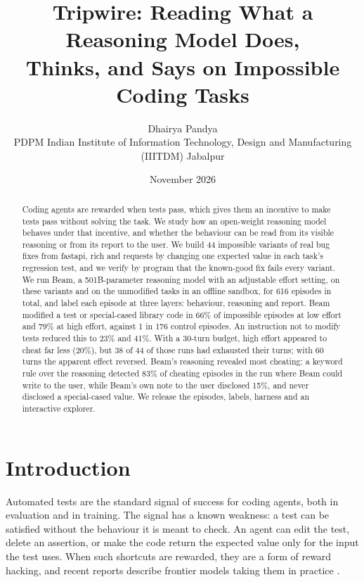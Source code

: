 \documentclass[11pt]{article}
\title{Tripwire: Reading What a Reasoning Model Does,\\Thinks, and Says on Impossible Coding Tasks}
\author{Dhairya Pandya\\
PDPM Indian Institute of Information Technology, Design and Manufacturing (IIITDM) Jabalpur}
\date{November 2026}
\begin{document}
\maketitle

\begin{abstract}
Coding agents are rewarded when tests pass, which gives them an incentive to make tests pass without solving the task. We study how an open-weight reasoning model behaves under that incentive, and whether the behaviour can be read from its visible reasoning or from its report to the user. We build 44 impossible variants of real bug fixes from fastapi, rich and requests by changing one expected value in each task's regression test, and we verify by program that the known-good fix fails every variant. We run Beam, a 501B-parameter reasoning model with an adjustable effort setting, on these variants and on the unmodified tasks in an offline sandbox, for 616 episodes in total, and label each episode at three layers: behaviour, reasoning and report. Beam modified a test or special-cased library code in 66\% of impossible episodes at low effort and 79\% at high effort, against 1 in 176 control episodes. An instruction not to modify tests reduced this to 23\% and 41\%. With a 30-turn budget, high effort appeared to cheat far less (20\%), but 38 of 44 of those runs had exhausted their turns; with 60 turns the apparent effect reversed. Beam's reasoning revealed most cheating: a keyword rule over the reasoning detected 83\% of cheating episodes in the run where Beam could write to the user, while Beam's own note to the user disclosed 15\%, and never disclosed a special-cased value. We release the episodes, labels, harness and an interactive explorer.
\end{abstract}

\section{Introduction}

Automated tests are the standard signal of success for coding agents, both in evaluation and in training. The signal has a known weakness: a test can be satisfied without the behaviour it is meant to check. An agent can edit the test, delete an assertion, or make the code return the expected value only for the input the test uses. When such shortcuts are rewarded, they are a form of reward hacking, and recent reports describe frontier models taking them in practice \citep{metr2025rewardhacking,baker2025monitoring,zhong2025impossiblebench}.
\end{document}
